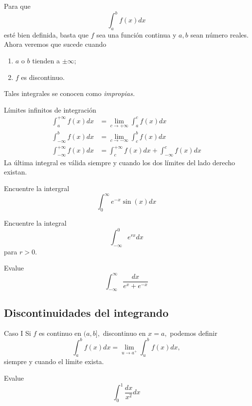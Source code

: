 Para que $$\displaystyle\int_{a}^{b}f(x)dx$$ est\'e bien definida, basta que $f$ sea una funci\'on continua y $a,b$ sean número reales. Ahora veremos que sucede cuando
\begin{enumerate}
 \item  $a$ o $b$ tienden a $\pm \infty;$
 \item $f$ es discontinuo.
\end{enumerate}

Tales integrales se conocen como \emph{impropias.}
 

{L\'imites infinitos de integraci\'on}
\begin{align}
\label{35.a}
 \displaystyle\int_{a}^{+\infty}f(x)dx &= \lim_{c\to +\infty} \int_{a}^{c}f(x)dx \\
\label{35.b}
 \displaystyle\int_{-\infty}^{b}f(x)dx &= \lim_{c\to -\infty} \int_{c}^{b}f(x)dx \\
 \label{35.c}
 \int_{-\infty}^{+\infty}f(x)dx &= \int_{c}^{+\infty}f(x)dx+\int_{-\infty}^{c}f(x)dx
\end{align}
La última integral es válida siempre y cuando los dos l\'imites del lado derecho existan.



\begin{problema}
\label{solved:35.6}
 Encuentre la intergral 
 $$\displaystyle \int_{0}^{\infty}e^{-x}\sin(x) dx$$
\end{problema}




\begin{problema}
 \label{solved:35.4}
Encuentre la integral
$$\displaystyle \int_{-\infty}^{0} e^{rx}dx$$ para $r>0.$
\end{problema}




\begin{problema}
 \label{solved:35.7}
Evalue 
$$
\displaystyle \int_{-\infty}^{\infty}
\dfrac{dx}{e^{x}+e^{-x}}
$$
\end{problema}


\subsection{Discontinuidades del integrando}

{Caso I}
Si $f$ es continuo en $(a,b],$ discontinuo en $x=a,$ podemos definir
$$
\displaystyle \int_{a}^{b}f(x)dx=\lim_{u\to a^{+}} \int_{u}^{b}f(x)dx,
$$ siempre y cuando el l\'imite exista.


\begin{problema}
 Evalue
 $$\displaystyle \int_{0}^{1}\dfrac{dx}{x^{2}} dx$$
\end{problema}



